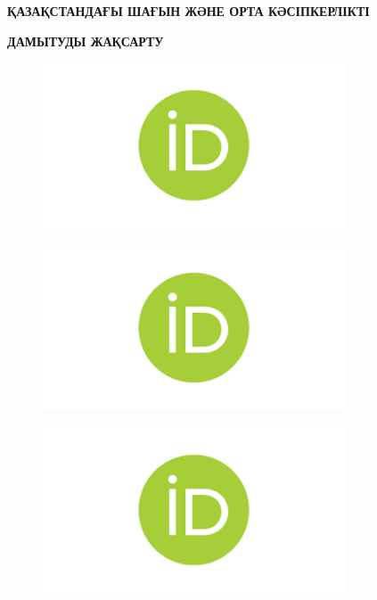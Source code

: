 
{\bfseries ҚАЗАҚСТАНДАҒЫ ШАҒЫН ЖӘНЕ ОРТА КӘСІПКЕРЛІКТІ}

{\bfseries ДАМЫТУДЫ ЖАҚСАРТУ}

\begin{figure}[H]
	\centering
	\includegraphics[width=0.8\textwidth]{media/ekon/image6}
	\caption*{}
\end{figure}

\begin{figure}[H]
	\centering
	\includegraphics[width=0.8\textwidth]{media/ekon/image6}
	\caption*{}
\end{figure}

\begin{figure}[H]
	\centering
	\includegraphics[width=0.8\textwidth]{media/ekon/image6}
	\caption*{}
\end{figure}

